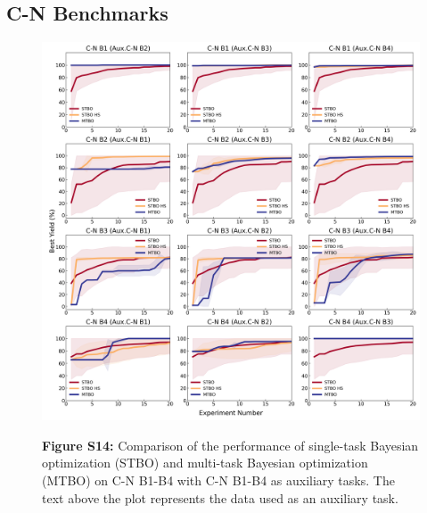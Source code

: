\subsection{C-N Benchmarks}

\begin{figure}
\caption{\textbf{Figure S14:} Comparison of the performance of single-task Bayesian optimization (STBO) and multi-task Bayesian optimization (MTBO) on C-N B1-B4 with C-N B1-B4 as auxiliary tasks. The text above the plot represents the data used as an auxiliary task.}\includegraphics[width=1\textwidth]{gfx/Appendix/baumgartner_cn_baumgartner_cn_one_cotraining_optimization.png}
\label{fig:13}
\end{figure}

